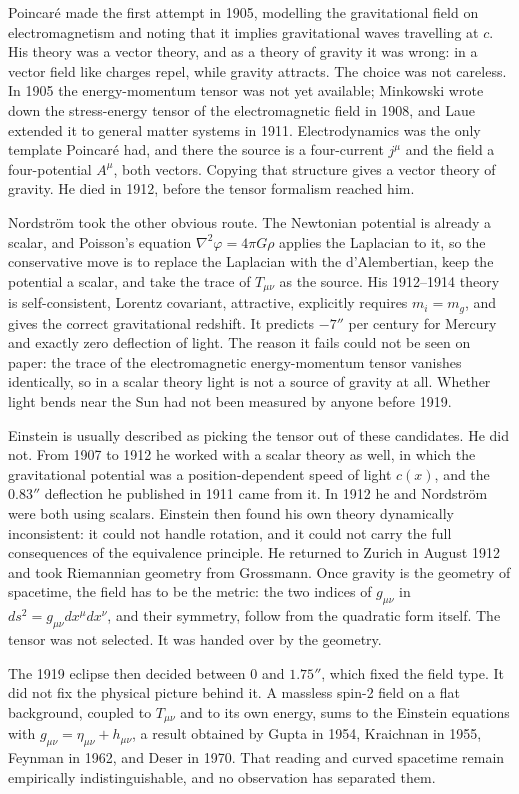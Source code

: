 \documentclass{article}
\begin{document}
Poincaré made the first attempt in 1905, modelling the gravitational field on electromagnetism and noting that it implies gravitational waves travelling at $c$. His theory was a vector theory, and as a theory of gravity it was wrong: in a vector field like charges repel, while gravity attracts. The choice was not careless. In 1905 the energy-momentum tensor was not yet available; Minkowski wrote down the stress-energy tensor of the electromagnetic field in 1908, and Laue extended it to general matter systems in 1911. Electrodynamics was the only template Poincaré had, and there the source is a four-current $j^\mu$ and the field a four-potential $A^\mu$, both vectors. Copying that structure gives a vector theory of gravity. He died in 1912, before the tensor formalism reached him.

Nordström took the other obvious route. The Newtonian potential is already a scalar, and Poisson's equation $\nabla^2\varphi = 4\pi G\rho$ applies the Laplacian to it, so the conservative move is to replace the Laplacian with the d'Alembertian, keep the potential a scalar, and take the trace of $T_{\mu\nu}$ as the source. His 1912--1914 theory is self-consistent, Lorentz covariant, attractive, explicitly requires $m_i = m_g$, and gives the correct gravitational redshift. It predicts $-7''$ per century for Mercury and exactly zero deflection of light. The reason it fails could not be seen on paper: the trace of the electromagnetic energy-momentum tensor vanishes identically, so in a scalar theory light is not a source of gravity at all. Whether light bends near the Sun had not been measured by anyone before 1919.

Einstein is usually described as picking the tensor out of these candidates. He did not. From 1907 to 1912 he worked with a scalar theory as well, in which the gravitational potential was a position-dependent speed of light $c(x)$, and the $0.83''$ deflection he published in 1911 came from it. In 1912 he and Nordström were both using scalars. Einstein then found his own theory dynamically inconsistent: it could not handle rotation, and it could not carry the full consequences of the equivalence principle. He returned to Zurich in August 1912 and took Riemannian geometry from Grossmann. Once gravity is the geometry of spacetime, the field has to be the metric: the two indices of $g_{\mu\nu}$ in $ds^2 = g_{\mu\nu}dx^\mu dx^\nu$, and their symmetry, follow from the quadratic form itself. The tensor was not selected. It was handed over by the geometry.

The 1919 eclipse then decided between $0$ and $1.75''$, which fixed the field type. It did not fix the physical picture behind it. A massless spin-2 field on a flat background, coupled to $T_{\mu\nu}$ and to its own energy, sums to the Einstein equations with $g_{\mu\nu} = \eta_{\mu\nu} + h_{\mu\nu}$, a result obtained by Gupta in 1954, Kraichnan in 1955, Feynman in 1962, and Deser in 1970. That reading and curved spacetime remain empirically indistinguishable, and no observation has separated them.
\end{document}
